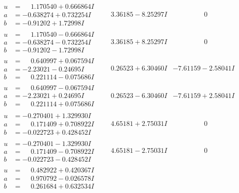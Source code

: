 \documentclass[1p]{elsarticle_modified}
\theoremstyle{definition}
\begin{document}
$$\begin{array}{c|c|c}
\begin{aligned}
u &= \phantom{-}1.170540 + 0.666864 I \\
a &= -0.638274 + 0.732254 I \\
b &= -0.91202 + 1.72998 I\end{aligned}
 & \phantom{-}3.36185 - 8.25297 I & \phantom{-0.000000 } 0 \\ \hline\begin{aligned}
u &= \phantom{-}1.170540 - 0.666864 I \\
a &= -0.638274 - 0.732254 I \\
b &= -0.91202 - 1.72998 I\end{aligned}
 & \phantom{-}3.36185 + 8.25297 I & \phantom{-0.000000 } 0 \\ \hline\begin{aligned}
u &= \phantom{-}0.640997 + 0.067594 I \\
a &= -2.23021 - 0.24695 I \\
b &= \phantom{-}0.221114 - 0.075686 I\end{aligned}
 & \phantom{-}0.26523 + 6.30460 I & -7.61159 - 2.58041 I \\ \hline\begin{aligned}
u &= \phantom{-}0.640997 - 0.067594 I \\
a &= -2.23021 + 0.24695 I \\
b &= \phantom{-}0.221114 + 0.075686 I\end{aligned}
 & \phantom{-}0.26523 - 6.30460 I & -7.61159 + 2.58041 I \\ \hline\begin{aligned}
u &= -0.270401 + 1.329930 I \\
a &= \phantom{-}0.171409 + 0.708922 I \\
b &= -0.022723 + 0.428452 I\end{aligned}
 & \phantom{-}4.65181 + 2.75031 I & \phantom{-0.000000 } 0 \\ \hline\begin{aligned}
u &= -0.270401 - 1.329930 I \\
a &= \phantom{-}0.171409 - 0.708922 I \\
b &= -0.022723 - 0.428452 I\end{aligned}
 & \phantom{-}4.65181 - 2.75031 I & \phantom{-0.000000 } 0 \\ \hline\begin{aligned}
u &= \phantom{-}0.482922 + 0.420367 I \\
a &= \phantom{-}0.970792 - 0.026578 I \\
b &= \phantom{-}0.261684 + 0.632534 I\end{aligned}

\end{array}$$
\end{document}
